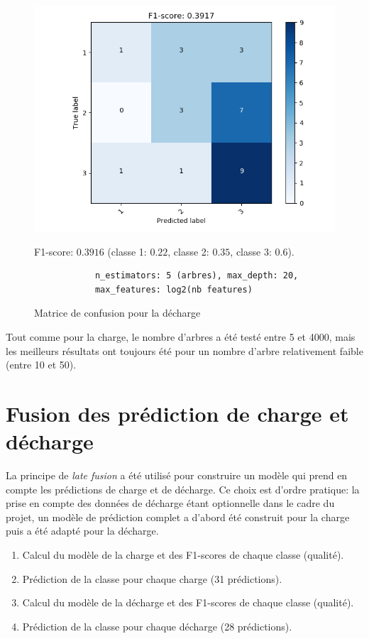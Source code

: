 \begin{figure}['h!']
    \centering
    \includegraphics[scale=0.65]{images/rf/cm_discharge.png}
    \caption{Matrice de confusion pour la décharge}
    \label{fig:RFCMdischarge}
    \begin{center}
        F1-score: $0.3916$ (classe 1: $0.22$, classe 2: $0.35$, classe 3: $0.6$).
        \begin{verbatim}
            n_estimators: 5 (arbres), max_depth: 20,
            max_features: log2(nb features)
        \end{verbatim}
    \end{center}
\end{figure}


Tout comme pour la charge, le nombre d'arbres a été testé entre 5 et 4000, mais les meilleurs résultats ont toujours été pour un nombre d'arbre relativement faible (entre 10 et 50).

\section{Fusion des prédiction de charge et décharge}
La principe de \emph{late fusion} a été utilisé pour construire un modèle qui prend en compte les prédictions de charge et de décharge. Ce choix est d'ordre pratique: la prise en compte des données de décharge étant optionnelle dans le cadre du projet, un modèle de prédiction complet a d'abord été construit pour la charge puis a été adapté pour la décharge.

\begin{enumerate}
    \item Calcul du modèle de la charge et des F1-scores de chaque classe (qualité).
    \item Prédiction de la classe pour chaque charge (31 prédictions).
    \item Calcul du modèle de la décharge et des F1-scores de chaque classe (qualité).
    \item Prédiction de la classe pour chaque décharge (28 prédictions).
\end{enumerate}

